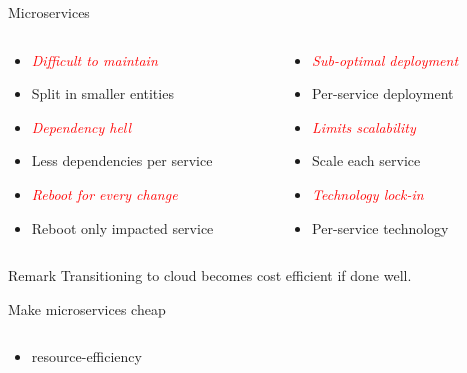 \documentclass{beamer}
\begin{document}
\begin{frame}{Microservices}
    \begin{columns}
        \begin{column}{0.53\textwidth}
            \begin{itemize}
                \item \emph{\textcolor{red}{Difficult to maintain}}
                \item Split in smaller entities 
                \item \emph{\textcolor{red}{Dependency hell}}
                \item Less dependencies per service
                \item \emph{\textcolor{red}{Reboot for every change}}
                \item Reboot only impacted service
            \end{itemize}
        \end{column}
        \begin{column}{0.5\textwidth}
            \begin{itemize}
                \item \emph{\textcolor{red}{Sub-optimal deployment}}
                \item Per-service deployment
                \item \emph{\textcolor{red}{Limits scalability}}
                \item Scale each service
                \item \emph{\textcolor{red}{Technology lock-in}}
                \item Per-service technology
            \end{itemize}
        \end{column}
    \end{columns}
    \vspace{1cm}
    \begin{alertblock}{Remark}
        Transitioning to cloud becomes cost efficient if done well.
    \end{alertblock}
\end{frame}
\begin{frame}{Make microservices cheap}
    \begin{columns}
        \begin{column}{0.36\textwidth}
            \begin{itemize}
                \item resource-efficiency
            \end{itemize}
        \end{column}
        \begin{column}{0.36\textwidth}
        \end{column}
        \begin{column}{0.36\textwidth}
        \end{column}
    \end{columns}
\end{frame}
\end{document}

